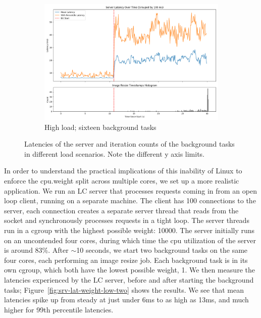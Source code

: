 \begin{figure}[t]
\begin{subfigure}[t]{0.32\textwidth}
        \includegraphics[width=\textwidth]{graphs/srv-lat-weight-high-sixteen.png}
        \caption{High load; sixteen background tasks}\label{fig:srv-lat-weight-high-sixteen}
    \end{subfigure}
    \caption{Latencies of the server and iteration counts of the background
    tasks in different load scenarios. Note the different y axis limits.}
\end{figure}

In order to understand the practical implications of this inability of Linux to
enforce the cpu.weight split across multiple cores, we set up a more realistic
application. We run an LC server that processes requests coming in from an open
loop client, running on a separate machine. The client has 100 connections to
the server, each connection creates a separate server thread that reads from the
socket and synchronously processes requests in a tight loop. The server threads
run in a cgroup with the highest possible weight: 10000. The server initially
runs on an uncontended four cores, during which time the cpu utilization of the
server is around 83\%. After $\sim$10 seconds, we start two background tasks
on the same four cores, each performing an image resize job. Each background
task is in its own cgroup, which both have the lowest possible weight, 1. We
then measure the latencies experienced by the LC server, before and after
starting the background tasks; Figure~\ref{fig:srv-lat-weight-low-two} shows the
results. We see that mean latencies spike up from steady at just under 6ms to as
high as 13ms, and much higher for 99th percentile latencies.

